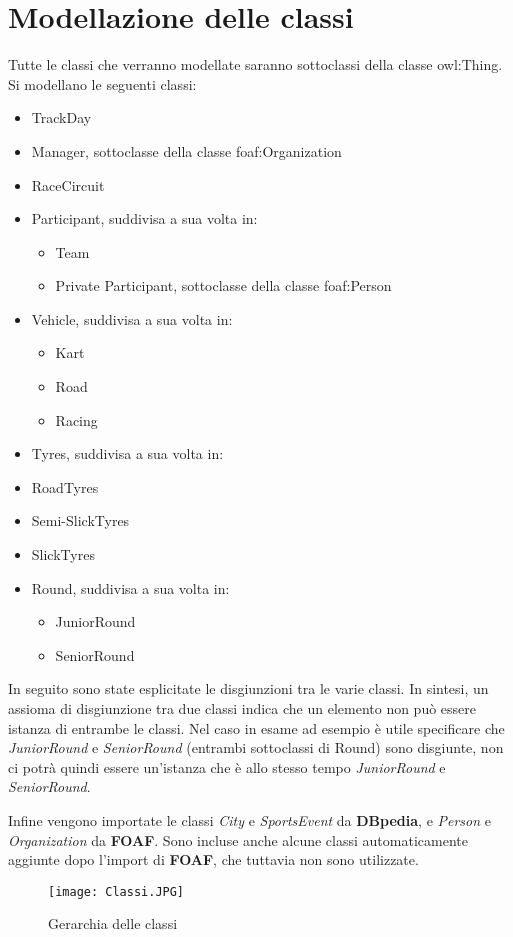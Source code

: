 \section{Modellazione delle classi}
Tutte le classi che verranno modellate saranno sottoclassi della classe owl:Thing. Si modellano le seguenti classi:
\begin{itemize}
\item TrackDay
\item Manager, sottoclasse della classe foaf:Organization
\item RaceCircuit
\item Participant, suddivisa a sua volta in:
\begin{itemize}
\item Team
\item Private Participant, sottoclasse della classe foaf:Person
\end{itemize}
\item Vehicle, suddivisa a sua volta in:
\begin{itemize}
\item Kart
\item Road
\item Racing
\end{itemize}
\item Tyres, suddivisa a sua volta in:
\item RoadTyres
\item Semi-SlickTyres
\item SlickTyres
\item Round, suddivisa a sua volta in:
\begin{itemize}
\item JuniorRound
\item SeniorRound
\end{itemize}
\end{itemize}
In seguito sono state esplicitate le disgiunzioni tra le varie classi. In sintesi, un assioma di disgiunzione tra due classi indica che un elemento non può essere istanza di entrambe le classi. Nel caso in esame ad esempio è utile specificare che \textit{JuniorRound} e \textit{SeniorRound} (entrambi sottoclassi di Round) sono disgiunte, non ci potrà quindi essere un’istanza che è allo stesso tempo \textit{JuniorRound} e \textit{SeniorRound}.
\\\par
Infine vengono importate le classi \textit{City} e \textit{SportsEvent} da \textbf{DBpedia}, e \textit{Person} e \textit{Organization} da \textbf{FOAF}. Sono incluse anche alcune classi automaticamente aggiunte dopo l’import di \textbf{FOAF}, che tuttavia non sono utilizzate.
\begin{figure}[h]
	\centering
	\texttt{[image: Classi.JPG]}
	\caption{Gerarchia delle classi}
\end{figure}
\clearpage
